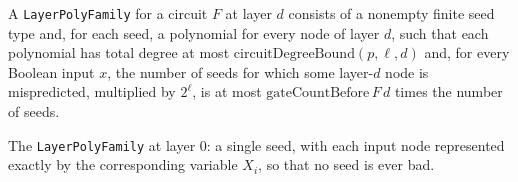\begin{definition}
\label{RazborovSmolensky.LayerPolyFamily}
\leanok
{}
A \texttt{LayerPolyFamily} for a circuit $F$ at layer $d$ consists of a nonempty finite seed type and,
for each seed, a polynomial for every node of layer $d$, such that each polynomial has total degree at
most $\mathrm{circuitDegreeBound}(p,\ell,d)$ and, for every Boolean input $x$, the number of seeds
for which some layer-$d$ node is mispredicted, multiplied by $2^{\ell}$, is at most
$\mathrm{gateCountBefore}\,F\,d$ times the number of seeds.
\end{definition}

\begin{definition}
\label{RazborovSmolensky.inputLayerFamily}
\leanok
{}
The \texttt{LayerPolyFamily} at layer $0$: a single seed, with each input node represented exactly by
the corresponding variable $X_i$, so that no seed is ever bad.
\end{definition}

